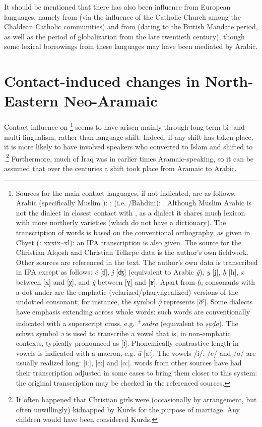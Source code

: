 \documentclass[output=paper]{langsci/langscibook}
\begin{document}
It should be mentioned that there has also been influence from European languages, namely from  (via the influence of the Catholic Church among the Chaldean Catholic communities) and from  (dating to the British Mandate period, as well as the period of globalization from the late twentieth century), though some lexical borrowings from these languages may have been mediated by Arabic.


\section{Contact-induced changes in North-Eastern Neo-Aramaic}\largerpage

Contact influence on \footnote{Sources for the main contact languages, if not indicated, are as follows:  Arabic (specifically Muslim ): \citet{WoodheadEtAl1967};  (i.e. /Bahdini): \citet{Chyet2003}. Although Muslim  Arabic is not the dialect in closest contact with , as a  dialect it shares much lexicon with more northerly varieties (which do not have a dictionary). The transcription of  words is based on the conventional {orthography}, as given in Chyet (\citeyear{Chyet2003}: xxxix–xl): an IPA transcription is also given. The source for the Christian Alqosh and Christian Telkepe data is the author’s own fieldwork. Other sources are referenced in the text. The author’s own  data is transcribed in IPA except as follows: \textit{č} [ʧ], \textit{j} [ʤ] (equivalent to Arabic \textit{ǧ}), \textit{y} [j], \textit{ḥ} [ħ], \textit{x} between [x] and [χ], and \textit{\.g} between [ɣ] and [ʁ]. Apart from \textit{ḥ}, consonants with a dot under are the {emphatic} (velarized/{pharyngealized}) versions of the undotted consonant; for instance, the symbol \textit{ð̣} represents [ðˤ]. Some dialects have {emphasis} extending across whole words: such words are conventionally indicated with a superscript cross, e.g. \textrm{\textsuperscript{+}}\textrm{\textit{sadra} }\textrm{(equivalent to} \textrm{\textit{ṣạḍ{\R}ạ}}). The schwa symbol \textit{ə} is used to transcribe a  vowel that is, in non-{emphatic} contexts, typically pronounced as [ɪ]. Phonemically contrastive length in vowels is indicated with a macron, e.g. \textit{ā} [aː]. The vowels /i/, /e/ and /o/ are usually realized long: [iː], [eː] and [oː].  words from other sources have had their transcription adjusted in some cases to bring them closer to this system: the original transcription may be checked in the referenced sources.} seems to have arisen mainly through long-term bi- and multi-lingualism, rather than {language shift}. Indeed, if any shift has taken place, it is more likely to have involved  speakers who converted to Islam and shifted to .\footnote{It often happened that Christian girls were (occasionally by arrangement, but often unwillingly) kidnapped by {Kurds} for the purpose of marriage. Any children would have been considered {Kurds}.} Furthermore, much of Iraq was in earlier times Aramaic-speaking, so it can be assumed that over the centuries a shift took place from Aramaic to Arabic. 
\end{document}
